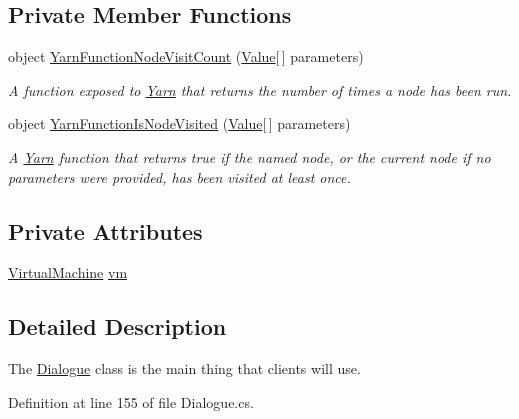 \subsection*{Private Member Functions}
\begin{DoxyCompactItemize}
\item 
object \hyperlink{a00090_a10c9f22d3f55e74f091cd6069c431094}{Yarn\-Function\-Node\-Visit\-Count} (\hyperlink{a00167}{Value}\mbox{[}$\,$\mbox{]} parameters)
\begin{DoxyCompactList}\small\item\em A function exposed to \hyperlink{a00050}{Yarn} that returns the number of times a node has been run. \end{DoxyCompactList}\item 
object \hyperlink{a00090_a1ab129bd84381928531d503304ca08d6}{Yarn\-Function\-Is\-Node\-Visited} (\hyperlink{a00167}{Value}\mbox{[}$\,$\mbox{]} parameters)
\begin{DoxyCompactList}\small\item\em A \hyperlink{a00050}{Yarn} function that returns true if the named node, or the current node if no parameters were provided, has been visited at least once. \end{DoxyCompactList}\end{DoxyCompactItemize}
\subsection*{Private Attributes}
\begin{DoxyCompactItemize}
\item 
\hyperlink{a00147}{Virtual\-Machine} \hyperlink{a00090_a8c1319357a9df6cff051328fb33224c7}{vm}
\end{DoxyCompactItemize}


\subsection{Detailed Description}
The \hyperlink{a00090}{Dialogue} class is the main thing that clients will use. 

Definition at line 155 of file Dialogue.\-cs.




